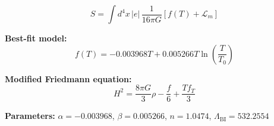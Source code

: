 
\begin{equation}
  S = \int d^4x \, |e| \, \frac{1}{16\pi G} \left[ f(T) + \mathcal{L}_m \right]
\end{equation}

\textbf{Best-fit model:}
\begin{equation}
  f(T) = -0.003968 T + 0.005266 T \ln\!\left(\frac{T}{T_0}\right)
\end{equation}

\textbf{Modified Friedmann equation:}
\begin{equation}
  H^2 = \frac{8\pi G}{3} \rho - \frac{f}{6} + \frac{T f_T}{3}
\end{equation}

\textbf{Parameters:}
$\alpha = -0.003968$, \quad
$\beta = 0.005266$, \quad
$n = 1.0474$, \quad
$\Lambda_{\text{BI}} = 532.2554$